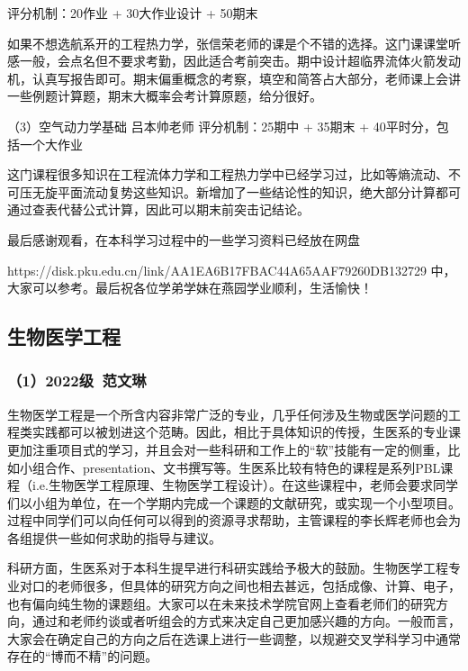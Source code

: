 \documentclass[11pt,oneside]{book}
\begin{document}
评分机制：20作业 + 30大作业设计 + 50期末

如果不想选航系开的工程热力学，张信荣老师的课是个不错的选择。这门课课堂听感一般，会点名但不要求考勤，因此适合考前突击。期中设计超临界流体火箭发动机，认真写报告即可。期末偏重概念的考察，填空和简答占大部分，老师课上会讲一些例题计算题，期末大概率会考计算原题，给分很好。

\vspace{10pt}

（3）空气动力学基础 吕本帅老师
评分机制：25期中 + 35期末 + 40平时分，包括一个大作业

\vspace{10pt}

这门课程很多知识在工程流体力学和工程热力学中已经学习过，比如等熵流动、不可压无旋平面流动复势这些知识。新增加了一些结论性的知识，绝大部分计算都可通过查表代替公式计算，因此可以期末前突击记结论。

\vspace{10pt}

最后感谢观看，在本科学习过程中的一些学习资料已经放在网盘

https://disk.pku.edu.cn/link/AA1EA6B17FBAC44A65AAF79260DB132729
中，大家可以参考。最后祝各位学弟学妹在燕园学业顺利，生活愉快！

\subsection{生物医学工程}
\subsubsection{（1）2022级\ 范文琳}

生物医学工程是一个所含内容非常广泛的专业，几乎任何涉及生物或医学问题的工程类实践都可以被划进这个范畴。因此，相比于具体知识的传授，生医系的专业课更加注重项目式的学习，并且会对一些科研和工作上的“软”技能有一定的侧重，比如小组合作、presentation、文书撰写等。生医系比较有特色的课程是系列PBL课程（i.e.生物医学工程原理、生物医学工程设计）。在这些课程中，老师会要求同学们以小组为单位，在一个学期内完成一个课题的文献研究，或实现一个小型项目。过程中同学们可以向任何可以得到的资源寻求帮助，主管课程的李长辉老师也会为各组提供一些如何求助的指导与建议。

\vspace{10pt}

科研方面，生医系对于本科生提早进行科研实践给予极大的鼓励。生物医学工程专业对口的老师很多，但具体的研究方向之间也相去甚远，包括成像、计算、电子，也有偏向纯生物的课题组。大家可以在未来技术学院官网上查看老师们的研究方向，通过和老师约谈或者听组会的方式来决定自己更加感兴趣的方向。一般而言，大家会在确定自己的方向之后在选课上进行一些调整，以规避交叉学科学习中通常存在的“博而不精”的问题。
\end{document}
